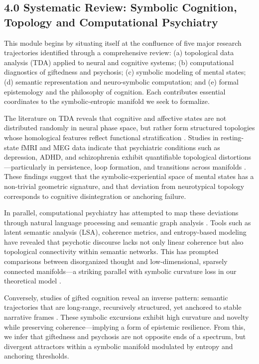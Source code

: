 \subsection*{4.0 Systematic Review: Symbolic Cognition, Topology and Computational Psychiatry}

This module begins by situating itself at the confluence of five major research trajectories identified through a comprehensive review: (a) topological data analysis (TDA) applied to neural and cognitive systems; (b) computational diagnostics of giftedness and psychosis; (c) symbolic modeling of mental states; (d) semantic representation and neuro-symbolic computation; and (e) formal epistemology and the philosophy of cognition. Each contributes essential coordinates to the symbolic-entropic manifold we seek to formalize.

The literature on TDA reveals that cognitive and affective states are not distributed randomly in neural phase space, but rather form structured topologies whose homological features reflect functional stratification \cite{carlsson2009topology, giusti2016two}. Studies in resting-state fMRI and MEG data indicate that psychiatric conditions such as depression, ADHD, and schizophrenia exhibit quantifiable topological distortions—particularly in persistence, loop formation, and transitions across manifolds \cite{saggar2018towards, kyeong2017adhd}. These findings suggest that the symbolic-experiential space of mental states has a non-trivial geometric signature, and that deviation from neurotypical topology corresponds to cognitive disintegration or anchoring failure.

In parallel, computational psychiatry has attempted to map these deviations through natural language processing and semantic graph analysis \cite{elvevag2007lsa, bzdok2018toward}. Tools such as latent semantic analysis (LSA), coherence metrics, and entropy-based modeling have revealed that psychotic discourse lacks not only linear coherence but also topological connectivity within semantic networks. This has prompted comparisons between disorganized thought and low-dimensional, sparsely connected manifolds—a striking parallel with symbolic curvature loss in our theoretical model \cite{gergen2009narrative}.

Conversely, studies of gifted cognition reveal an inverse pattern: semantic trajectories that are long-range, recursively structured, yet anchored to stable narrative frames \cite{silverman2009giftedness, wang2018computational, baum2017twiceexceptional, neihart2002profiles}. These symbolic excursions exhibit high curvature and novelty while preserving coherence—implying a form of epistemic resilience. From this, we infer that giftedness and psychosis are not opposite ends of a spectrum, but divergent attractors within a symbolic manifold modulated by entropy and anchoring thresholds.

